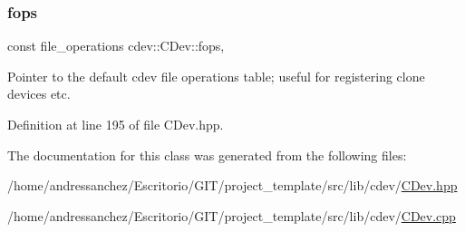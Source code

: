 \subsubsection{\texorpdfstring{fops}{fops}}
{\footnotesize\ttfamily const file\+\_\+operations cdev\+::\+C\+Dev\+::fops\hspace{0.3cm}{\ttfamily [static]}, {\ttfamily [protected]}}

Pointer to the default cdev file operations table; useful for registering clone devices etc. 

Definition at line 195 of file C\+Dev.\+hpp.



The documentation for this class was generated from the following files\+:\begin{DoxyCompactItemize}
\item 
/home/andressanchez/\+Escritorio/\+G\+I\+T/project\+\_\+template/src/lib/cdev/\hyperlink{CDev_8hpp}{C\+Dev.\+hpp}\item 
/home/andressanchez/\+Escritorio/\+G\+I\+T/project\+\_\+template/src/lib/cdev/\hyperlink{CDev_8cpp}{C\+Dev.\+cpp}\end{DoxyCompactItemize}
